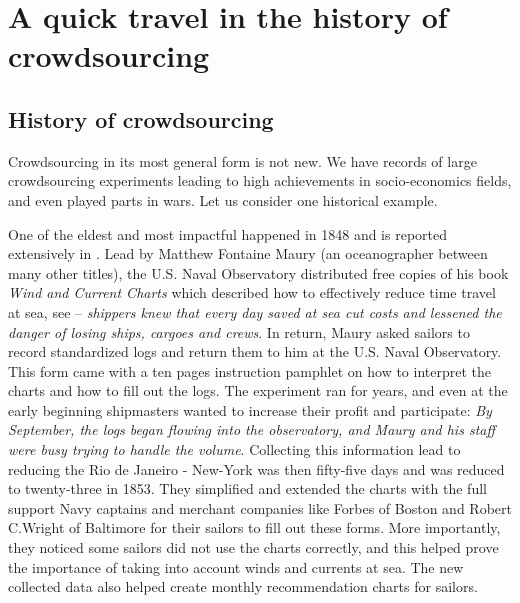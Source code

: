 \chapter{A quick travel in the history of crowdsourcing}
\label{chap:history-crowdsourcing}
\section{History of crowdsourcing}
\label{sec:history-of-crowdsourcing}
Crowdsourcing in its most general form is not new. We have records of large crowdsourcing experiments leading to high achievements in socio-economics fields, and even played parts in wars. Let us consider one historical example.

One of the eldest and most impactful happened in 1848 and is reported extensively in \citet{tracksinthesea}. Lead by Matthew Fontaine Maury (an oceanographer between many other titles), the U.S. Naval Observatory distributed free copies of his book \emph{Wind and Current Charts} which described how to effectively reduce time travel at sea, see  -- \emph{shippers knew that every day saved at sea cut costs and lessened the danger of losing ships, cargoes and crews}. In return, Maury asked sailors to record standardized logs and return them to him at the U.S. Naval Observatory.
This form came with a ten pages instruction pamphlet on how to interpret the charts and how to fill out the logs.
The experiment ran for years, and even at the early beginning shipmasters wanted to increase their profit and participate: \emph{By September, the logs began flowing into the observatory, and Maury and his staff were busy trying to handle the volume}.
Collecting this information lead to reducing the Rio de Janeiro - New-York was then fifty-five days and was reduced to twenty-three in 1853.
They simplified and extended the charts with the full support Navy captains and merchant companies like Forbes of Boston and Robert C.Wright of Baltimore for their sailors to fill out these forms.
More importantly, they noticed some sailors did not use the charts correctly, and this helped prove the importance of taking into account winds and currents at sea.
The new collected data also helped create monthly recommendation charts for sailors.
